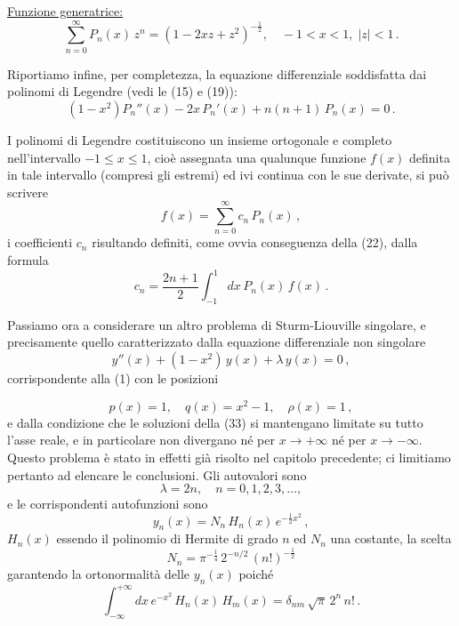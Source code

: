 \documentclass[11pt, a4paper]{book}
\numberwithin{equation}{section}
\begin{document}
\medskip
\noindent\uline{Funzione generatrice:}
\begin{equation}
\sum_{n=0}^{\infty} P_n(x)\, z^n = \left(1 - 2xz + z^2\right)^{-\frac{1}{2}}, \quad -1 < x < 1,\; |z| < 1 \,. \tag{29}
\end{equation}

Riportiamo infine, per completezza, la equazione differenziale soddisfatta dai polinomi di Legendre (vedi le (15) e (19)):
\begin{equation}
(1-x^2) P_n''(x) - 2x\, P_n'(x) + n(n+1)\, P_n(x) = 0 \,. \tag{30}
\end{equation}

I polinomi di Legendre costituiscono un insieme ortogonale e
completo nell'intervallo $-1 \leq x \leq 1$, cioè assegnata una qualunque
funzione $f(x)$ definita in tale intervallo (compresi gli estremi) ed ivi continua con le sue derivate, si può scrivere
\begin{equation}
f(x) = \sum_{n=0}^{\infty} c_n\, P_n(x) \,, \tag{31}
\end{equation}
i coefficienti $c_n$ risultando definiti, come ovvia conseguenza della (22),
dalla formula
\begin{equation}
c_n = \frac{2n+1}{2} \int_{-1}^{1} dx\, P_n(x)\, f(x) \,. \tag{32}
\end{equation}

Passiamo ora a considerare un altro problema di Sturm-Liouville
singolare, e precisamente quello caratterizzato dalla equazione differenziale non singolare
\begin{equation}
y''(x) + (1-x^2)\, y(x) + \lambda\, y(x) = 0 \,, \tag{33}
\end{equation}
corrispondente alla (1) con le posizioni


\begin{equation}
p(x) = 1, \quad q(x) = x^2 - 1, \quad \rho(x) = 1 \,, \tag{34}
\end{equation}
e dalla condizione che le soluzioni della (33) si mantengano limitate
su tutto l'asse reale, e in particolare non divergano né per $x \to +\infty$
né per $x \to -\infty$. Questo problema è stato in effetti già risolto
nel capitolo precedente; ci limitiamo pertanto ad elencare le conclusioni. Gli autovalori sono
\begin{equation}
\lambda = 2n, \quad n = 0, 1, 2, 3, \ldots, \tag{35}
\end{equation}
e le corrispondenti autofunzioni sono
\begin{equation}
y_n(x) = N_n\, H_n(x)\, e^{-\frac{1}{2}x^2} \,, \tag{36}
\end{equation}
$H_n(x)$ essendo il polinomio di Hermite di grado $n$ ed $N_n$ una
costante, la scelta
\begin{equation}
N_n = \pi^{-\frac{1}{4}}\, 2^{-n/2}\, (n!)^{-\frac{1}{2}} \tag{37}
\end{equation}
garantendo la ortonormalità delle $y_n(x)$ poiché
\begin{equation}
\int_{-\infty}^{+\infty} dx\, e^{-x^2}\, H_n(x)\, H_m(x) = \delta_{nm}\, \sqrt{\pi}\, 2^n\, n! \,. \tag{38}
\end{equation}
\end{document}

